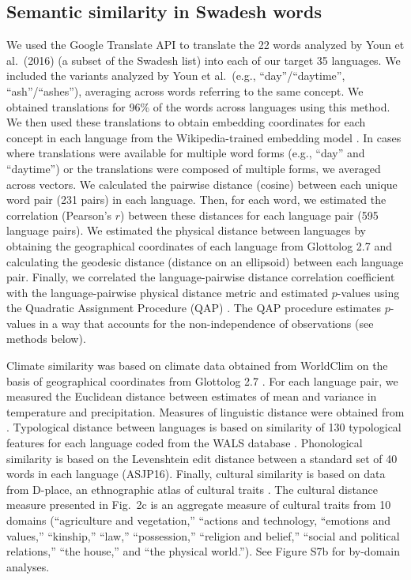 \documentclass[9pt,twocolumn,twoside,lineno]{pnas-new}
\begin{document}
{\subsection*{Semantic similarity in Swadesh words}
We used the Google Translate  API to translate the 22 words analyzed by Youn et al.\ (2016) \cite{swadesh1952lexico} (a subset of the Swadesh list) into each of our target 35 languages.  We included the variants analyzed by Youn et al.\ (e.g., ``day''/``daytime'', ``ash''/``ashes''), averaging across words referring to the same concept. We obtained translations for 96\% of the words across languages using this method. We then used these translations to obtain embedding coordinates for each concept in each language from the Wikipedia-trained embedding model \cite{bojanowski2016enriching}. In cases where translations were available for multiple word forms (e.g., ``day'' and ``daytime'') or the translations were composed of multiple forms, we averaged across vectors.  We  calculated the  pairwise distance (cosine) between each unique word pair (231 pairs)  in each language. Then, for each word, we estimated the correlation (Pearson's $r$) between these distances for  each language pair (595 language pairs). We estimated the physical distance between languages by obtaining the geographical coordinates of each language from Glottolog 2.7 \cite{HammarstroemEtAl2011Oslo} and calculating the geodesic distance (distance on an ellipsoid) between each language pair. Finally, we correlated the language-pairwise distance correlation coefficient with the language-pairwise physical distance metric and estimated $p$-values using the Quadratic Assignment Procedure (QAP) \cite{snapackage}. The QAP procedure estimates $p$-values in a way that accounts for the non-independence of observations (see methods below).

 Climate similarity was based on climate data obtained from WorldClim \cite{fick2017worldclim} on the basis of geographical coordinates from Glottolog 2.7 \cite{HammarstroemEtAl2011Oslo}. For each language pair, we  measured the Euclidean distance between estimates of mean and variance in temperature and precipitation. Measures of linguistic distance were obtained from \cite{dediu2018trees}. Typological distance between languages is based on similarity of 130 typological features for each language coded from the WALS database \cite{wals2013}.  Phonological similarity is based on the Levenshtein edit distance between a standard set of 40 words in each language \cite{wichmann_asjp_2013} (ASJP16). Finally, cultural similarity is based on data from D-place, an ethnographic atlas of cultural traits \cite{kirby2016d,thompson2020cultural}. The cultural distance measure presented in Fig.\ 2c is an aggregate measure of cultural traits from 10 domains (``agriculture and vegetation,'' ``actions and technology, ``emotions and values,'' ``kinship,'' ``law,'' ``possession,'' ``religion and belief,'' ``social and political relations,'' ``the house,'' and ``the physical world.''). See Figure S7b for by-domain analyses. 

}
\end{document}
